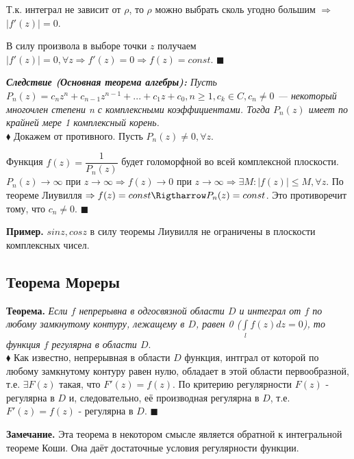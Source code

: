 \documentclass[a4paper, 12pt]{report}
\begin{document}
Т.к. интеграл не зависит от $\rho$, то $\rho$ можно выбрать сколь угодно большим $\Rightarrow$ $|f'(z)| = 0$.

В силу произвола в выборе точки $z$ получаем $|f'(z)| = 0, \forall z \Rightarrow f'(z) = 0 \Rightarrow f(z) = const.$ $\blacksquare$
\par\bigskip
\textit{\textbf{Следствие (Основная теорема алгебры):} Пусть $P_n(z) = c_nz^n + c_{n-1}z^{n-1} + ... + c_1z + c_0, n \geq 1, c_k \in C, c_n \ne 0$ --- некоторый многочлен степени n с комплексными коэффициентами. Тогда $P_n(z)$ имеет по крайней мере 1 комплексный корень.}\\
$\blacklozenge$ \hspace{1 mm} Докажем от противного. Пусть $P_n(z) \ne 0, \forall z$.

Функция $f(z) = \dfrac{1}{P_n(z)}$ будет голоморфной во всей комплексной плоскости. $P_n(z) \rightarrow \infty$ при $z \rightarrow \infty \Rightarrow f(z) \rightarrow 0$ при $z \rightarrow \infty \Rightarrow \exists M: |f(z)| \leq M, \forall z$. По теореме Лиувилля $\Rightarrow f(z) = const \Rigtharrow P_n(z) = const$. Это противоречит тому, что $c_n \ne 0$. $\blacksquare$

\par\bigskip
\textbf{Пример. } \quad $sinz, cosz$ в силу теоремы Лиувилля не ограничены в плоскости комплексных чисел. 

\subsection{Теорема Мореры}

\textbf{Теорема. }\quad
\textit{Если $f$ непрерывна в одгосвязной области $D$ и интеграл от $f$ по любому замкнутому контуру, лежащему в $D$, равен 0 ($\int\limits_{l}f(z)dz = 0$), то функция $f$ регулярна в области $D$}.\\
$\blacklozenge$\hspace{2 mm} Как известно, непрерывная в области $D$ функция, интграл от которой по любому замкнутому контуру равен нулю, обладает в этой области первообразной, т.е. $\exists F(z)$ такая, что $F'(z) = f(z)$. По критерию регулярности $F(z)$ - регулярна в $D$ и, следовательно, её производная регулярна в $D$, т.е. $F'(z) = f(z)$ - регулярна в $D$. $\blacksquare$
\par\bigskip
\textbf{Замечание. }\quad Эта теорема в некотором смысле является обратной к интегральной теореме Коши. Она даёт достаточные условия регулярности функции.
\end{document}
